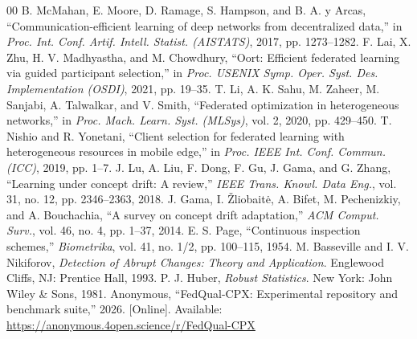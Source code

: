 \documentclass[conference]{IEEEtran}
\begin{document}
\begin{thebibliography}{00}
 B. McMahan, E. Moore, D. Ramage, S. Hampson, and B. A. y Arcas, ``Communication-efficient learning of deep networks from decentralized data,'' in \textit{Proc. Int. Conf. Artif. Intell. Statist. (AISTATS)}, 2017, pp. 1273--1282.
 F. Lai, X. Zhu, H. V. Madhyastha, and M. Chowdhury, ``Oort: Efficient federated learning via guided participant selection,'' in \textit{Proc. USENIX Symp. Oper. Syst. Des. Implementation (OSDI)}, 2021, pp. 19--35.
 T. Li, A. K. Sahu, M. Zaheer, M. Sanjabi, A. Talwalkar, and V. Smith, ``Federated optimization in heterogeneous networks,'' in \textit{Proc. Mach. Learn. Syst. (MLSys)}, vol. 2, 2020, pp. 429--450.
 T. Nishio and R. Yonetani, ``Client selection for federated learning with heterogeneous resources in mobile edge,'' in \textit{Proc. IEEE Int. Conf. Commun. (ICC)}, 2019, pp. 1--7.
 J. Lu, A. Liu, F. Dong, F. Gu, J. Gama, and G. Zhang, ``Learning under concept drift: A review,'' \textit{IEEE Trans. Knowl. Data Eng.}, vol. 31, no. 12, pp. 2346--2363, 2018.
 J. Gama, I. \v{Z}liobait\.{e}, A. Bifet, M. Pechenizkiy, and A. Bouchachia, ``A survey on concept drift adaptation,'' \textit{ACM Comput. Surv.}, vol. 46, no. 4, pp. 1--37, 2014.
 E. S. Page, ``Continuous inspection schemes,'' \textit{Biometrika}, vol. 41, no. 1/2, pp. 100--115, 1954.
 M. Basseville and I. V. Nikiforov, \textit{Detection of Abrupt Changes: Theory and Application}. Englewood Cliffs, NJ: Prentice Hall, 1993.
 P. J. Huber, \textit{Robust Statistics}. New York: John Wiley \& Sons, 1981.
 Anonymous, ``FedQual-CPX: Experimental repository and benchmark suite,'' 2026. [Online]. Available: \url{https://anonymous.4open.science/r/FedQual-CPX}
\end{thebibliography}
\end{document}
